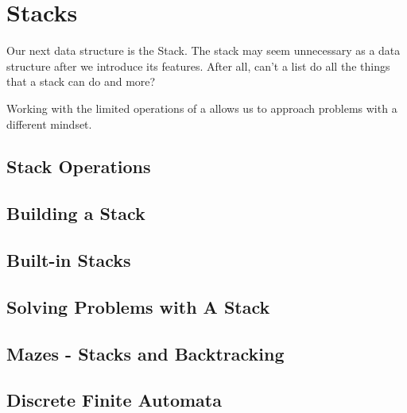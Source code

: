 \chapter{Stacks}
Our next data structure is the Stack.
The stack may seem unnecessary as a data structure after we introduce its features.  
After all, can't a list do all the things that a stack can do and more? 

Working with the limited operations of a allows us to approach problems with a different mindset.

\section{Stack Operations}


\section{Building a Stack}


	



\section{Built-in Stacks}

\section{Solving Problems with A Stack}


\section{Mazes - Stacks and Backtracking}



\section{Discrete Finite Automata}
